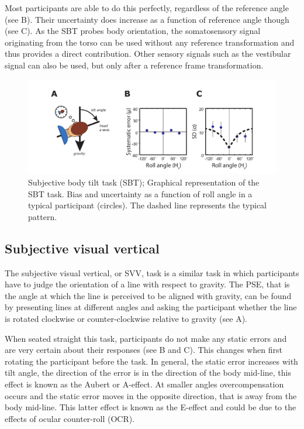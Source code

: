 Most participants are able to do this perfectly, regardless of the reference angle (see B). Their uncertainty does increase as a function of reference angle though (see C).
As the SBT probes body orientation, the somatosensory signal originating from the torso can be used without any reference transformation and thus provides a direct contribution. Other sensory signals such as the vestibular signal can also be used, but only after a reference frame transformation.

\begin{figure}
    \includegraphics[width=1.0\textwidth]{src/intro/figures/sbt.pdf}

    \caption{Subjective body tilt task (SBT);  Graphical representation of the SBT task.  Bias and  uncertainty as a function of roll angle in a typical participant (circles). The dashed line represents the typical pattern.}
    \label{intro:fig4}
\end{figure}


\subsection{Subjective visual vertical}
The subjective visual vertical, or SVV, task is a similar task in which participants have to judge the orientation of a line with respect to gravity. The PSE, that is the angle at which the line is perceived to be aligned with gravity, can be found by presenting lines at different angles and asking the participant whether the line is rotated clockwise or counter-clockwise relative to gravity (see A).

When seated straight this task, participants do not make any static errors and are very certain about their responses (see B and C). This changes when first rotating the participant before the task. In general, the static error increases with tilt angle, the direction of the error is in the direction of the body mid-line, this effect is known as the Aubert or A-effect. At smaller angles overcompensation occurs and the static error moves in the opposite direction, that is away from the body mid-line. This latter effect is known as the E-effect and could be due to the effects of ocular counter-roll (OCR).

